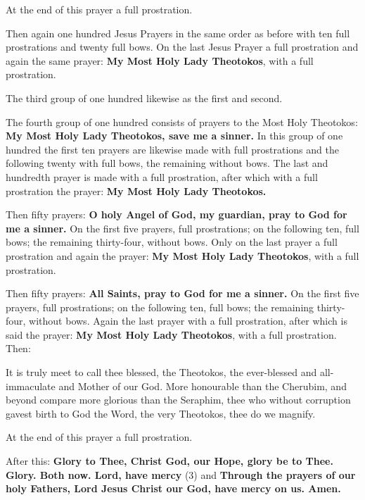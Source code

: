 At the end of this prayer a full prostration.

Then again one hundred Jesus Prayers in the same order as before with ten full prostrations and twenty full bows. On the last Jesus Prayer a full prostration and again the same prayer: \textbf{My Most Holy Lady Theotokos}, with a full prostration.

The third group of one hundred likewise as the first and second.

The fourth group of one hundred consists of prayers to the Most Holy Theotokos: \textbf{My Most Holy Lady Theotokos, save me a sinner.} In this group of one hundred the first ten prayers are likewise made with full prostrations and the following twenty with full bows, the remaining without bows. The last and hundredth prayer is made with a full prostration, after which with a full prostration the prayer: \textbf{My Most Holy Lady Theotokos.}

Then fifty prayers: \textbf{O holy Angel of God, my guardian, pray to God for me a sinner.} On the first five prayers, full prostrations; on the following ten, full bows; the remaining thirty-four, without bows. Only on the last prayer a full prostration and again the prayer: \textbf{My Most Holy Lady Theotokos}, with a full prostration.

Then fifty prayers: \textbf{All Saints, pray to God for me a sinner.} On the first five prayers, full prostrations; on the following ten, full bows; the remaining thirty-four, without bows. Again the last prayer with a full prostration, after which is said the prayer: \textbf{My Most Holy Lady Theotokos}, with a full prostration. Then:

\begin{adjustwidth}{1cm}{1cm}
It is truly meet to call thee blessed, the Theotokos, the ever-blessed and all-immaculate and Mother of our God. More honourable than the Cherubim, and beyond compare more glorious than the Seraphim, thee who without corruption gavest birth to God the Word, the very Theotokos, thee do we magnify.
\end{adjustwidth}

At the end of this prayer a full prostration.

After this: \textbf{Glory to Thee, Christ God, our Hope, glory be to Thee. Glory. Both now. Lord, have mercy} (3) and \textbf{Through the prayers of our holy Fathers, Lord Jesus Christ our God, have mercy on us. Amen.}

